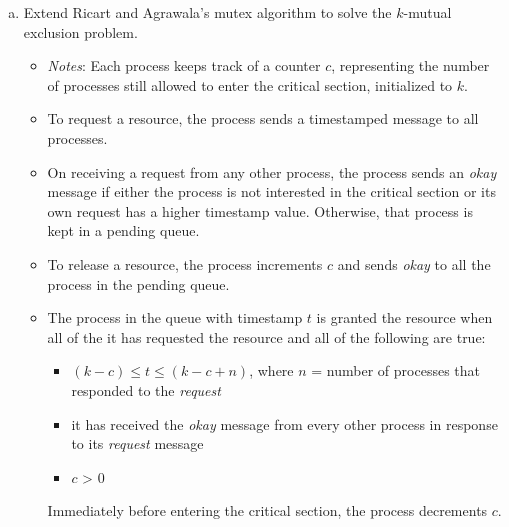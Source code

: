 \documentclass[11pt]{article}
\newcounter{problem}
\begin{document}
\begin{enumerate}
\begin{enumerate}[(a)]
  \item Extend Ricart and Agrawala's mutex algorithm to solve the $k$-mutual
    exclusion problem.

    \begin{itemize}
    \item \emph{Notes}: Each process keeps track of a counter $c$, representing
      the number of processes still allowed to enter the critical section,
      initialized to $k$.
    \item To request a resource, the process sends a timestamped message to all
      processes.
    \item On receiving a request from any other process, the process sends an
      \emph{okay} message if either the process is not interested in the
      critical section or its own request has a higher timestamp
      value. Otherwise, that process is kept in a pending queue.
    \item To release a resource, the process increments $c$ and sends
      \emph{okay} to all the process in the pending queue.
    \item The process in the queue with timestamp $t$ is granted the resource
      when all of the it has requested the resource and all of the following are
      true:
      \begin{itemize}                                                 
      \item $(k-c)\leq t \leq(k-c+n)$, where $n$ = number of processes that
        responded to the \emph{request}
      \item it has received the \emph{okay} message from every other process in
        response to its \emph{request} message
      \item $c$ > 0
      \end{itemize}
      Immediately before entering the critical section, the process decrements
      $c$.
    \end{itemize}

  \end{enumerate}                                                 
\end{enumerate}                                                 
\end{document}
